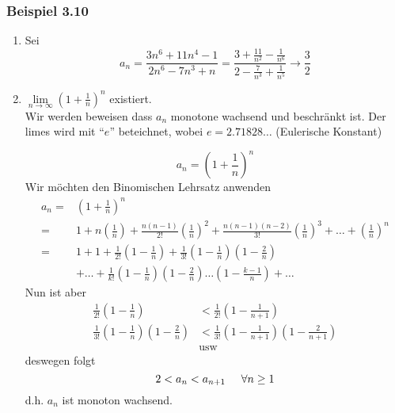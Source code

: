 \subsubsection*{Beispiel 3.10}
\begin{enumerate}
\item Sei \[{a_n} = \frac{{3{n^6} + 11{n^4} - 1}}{{2{n^6} - 7{n^3} + n}} = \frac{{3 + \frac{{11}}{{{n^2}}} - \frac{1}{{{n^6}}}}}{{2 - \frac{7}{{{n^3}}} + \frac{1}{{{n^5}}}}} \to \frac{3}{2}\]
\item $\mathop {\lim }\limits_{n \to \infty } {\left( {1 + \frac{1}{n}} \right)^n}$ existiert. \\

Wir werden beweisen dass $a_n$ monotone wachsend und beschränkt ist. Der limes wird mit ``$e$'' beteichnet, wobei $e=2.71828\dots$ (Eulerische Konstant)
\begin{beweis}{}
\[a_n={\left( {1 + \frac{1}{n}} \right)^n}\]
Wir möchten den Binomischen Lehrsatz anwenden 
\begin{align*}
{a_n} =&{\left( {1 + \frac{1}{n}} \right)^n}\\ 
=&1 + n\left( {\frac{1}{n}} \right) + \frac{{n(n - 1)}}{{2!}}{\left( {\frac{1}{n}} \right)^2} + \frac{{n(n - 1)(n - 2)}}{{3!}}{\left( {\frac{1}{n}} \right)^3} +  \ldots  + {\left( {\frac{1}{n}} \right)^n}\\
=&1 + 1 + \frac{1}{{2!}}\left( {1 - \frac{1}{n}} \right) + \frac{1}{{3!}}\left( {1 - \frac{1}{n}} \right)\left( {1 - \frac{2}{n}} \right)\\
&+\ldots  + \frac{1}{{k!}}\left( {1 - \frac{1}{n}} \right)\left( {1 - \frac{2}{n}} \right) \ldots \left( {1 - \frac{{k - 1}}{n}} \right) +  \ldots 
\end{align*}
Nun ist aber 
\begin{align*}
\frac{1}{{2!}}\left( {1 - \frac{1}{n}} \right)&< \frac{1}{{2!}}\left( {1 - \frac{1}{{n + 1}}} \right)\\
\frac{1}{{3!}}\left( {1 - \frac{1}{n}} \right)\left( {1 - \frac{2}{n}} \right)&< \frac{1}{{3!}}\left( {1 - \frac{1}{{n + 1}}} \right)\left( {1 - \frac{2}{{n + 1}}} \right)\\
&\text{usw}
\end{align*}
deswegen folgt \[2 < a_n < a_{n+1}\hspace{5mm}\forall n\geq 1\]
d.h. $a_n$ ist monoton wachsend.\\


\end{beweis}
\end{enumerate}
